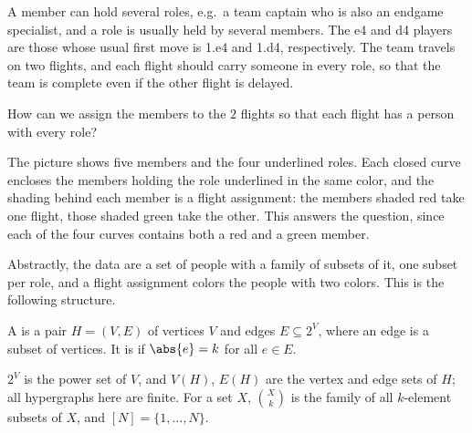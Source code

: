 \begin{eg}
\begin{center}
\begin{minipage}[c]{0.55\linewidth}
        \end{minipage}
    \end{center}
    A member can hold several roles, e.g.\ a team captain who is also an endgame specialist, and a role is usually held by several members. The e4 and d4 players are those whose usual first move is 1.e4 and 1.d4, respectively. The team travels on two flights, and each flight should carry someone in every role, so that the team is complete even if the other flight is delayed.
\end{eg}

\begin{question}
    How can we assign the members to the \(2\) flights so that each flight has a person with every role?
\end{question}

The picture shows five members and the four underlined roles. Each closed curve encloses the members holding the role underlined in the same color, and the shading behind each member is a flight assignment: the members shaded red take one flight, those shaded green take the other. This answers the question, since each of the four curves contains both a red and a green member.

Abstractly, the data are a set of people with a family of subsets of it, one subset per role, and a flight assignment colors the people with two colors. This is the following structure.

\begin{definition}[Hypergraph]
    A  is a pair \(H = (V, E)\) of vertices \(V\) and edges \(E \subseteq 2^V\), where an edge is a subset of vertices. It is  if \(\abs{e} = k\) for all \(e \in E\).
\end{definition}

\begin{notation}
    \(2^V\) is the power set of \(V\), and \(V(H)\), \(E(H)\) are the vertex and edge sets of \(H\); all hypergraphs here are finite. For a set \(X\), \(\binom{X}{k}\) is the family of all \(k\)-element subsets of \(X\), and \([N] = \{1, \ldots, N\}\).
\end{notation}


